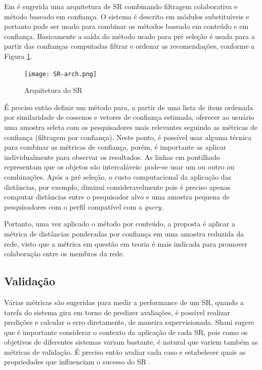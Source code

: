 \documentclass[12pt]{article}
\begin{document}
Em \cite{massa2004trust} é sugerida uma arquitetura de SR combinando filtragem colaborativa e método baseado em confiança. 
O sistema é descrito em módulos substituíveis e portanto pode ser usado para combinar os métodos baseado em conteúdo e em 
confiança. Basicamente a saída do método usado para pré seleção é usada para a partir das confianças computadas filtrar e 
ordenar as recomendações, conforme a Figura \ref{fig:sr-arch}.

\begin{center}
 \begin{figure}[ht]
   \texttt{[image: SR-arch.png]}
   \caption{Arquitetura do SR}
   \label{fig:sr-arch}
 \end{figure}
\end{center}

É preciso então definir um método para, a partir de uma lista de itens ordenada por similaridade de cossenos e vetores de 
confiança estimada, oferecer ao usuário uma amostra seleta com os pesquisadores mais relevantes seguindo as métricas de confiança
(filtragem por confiança). Neste ponto, é possível usar alguma técnica para combinar as métricas de confiança, porém, é importante 
as aplicar individualmente para observar os resultados. As linhas em pontilhado representam que os objetos são intercaláveis: 
pode-se usar um ou outro ou combinações. Após a pré seleção, o custo computacional da aplicação das distâncias, por exemplo, 
diminui consideravelmente pois é preciso apenas computar distâncias entre  o pesquisador alvo e uma amostra pequena de 
pesquisadores com o perfil compatível com a \textit{query}.

Portanto, uma vez aplicado o método por conteúdo, a proposta é aplicar a métrica de distâncias ponderadas por confiança em uma 
amostra reduzida da rede, visto que a métrica em questão em teoria é mais indicada para promover colaboração entre os membros da 
rede.

\subsection{Validação} \label{sect:validation}

Várias métricas são sugeridas para medir a performance de um SR, quando a tarefa do sistema gira em torno de predizer avaliações, 
é possível realizar predições e calcular o erro diretamente, de maneira supervisionada. Shani \cite{shani2011evaluating} sugere 
que é importante considerar o contexto da aplicação de cada SR, pois como os objetivos de diferentes sistemas variam bastante, é 
natural que variem também as métricas de validação. É preciso então avaliar cada caso e estabelecer quais as propriedades que 
influenciam o sucesso do SR \cite{shani2011evaluating}.
\end{document}
